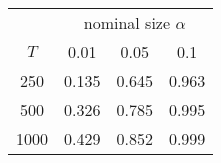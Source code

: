 % 
\begin{tabular}{cccc}
  \hline
  & \multicolumn{3}{c}{nominal size $\alpha$} \\
 $T$ & 0.01 & 0.05 & 0.1 \\
 \hline
250 & 0.135 & 0.645 & 0.963 \\ 
  500 & 0.326 & 0.785 & 0.995 \\ 
  1000 & 0.429 & 0.852 & 0.999 \\ 
   \hline
\end{tabular}
